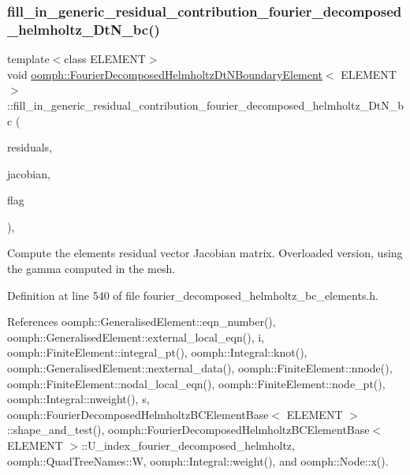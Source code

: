 \subsubsection{\texorpdfstring{fill\+\_\+in\+\_\+generic\+\_\+residual\+\_\+contribution\+\_\+fourier\+\_\+decomposed\+\_\+helmholtz\+\_\+\+Dt\+N\+\_\+bc()}{fill\_in\_generic\_residual\_contribution\_fourier\_decomposed\_helmholtz\_DtN\_bc()}}
{\footnotesize\ttfamily template$<$class E\+L\+E\+M\+E\+NT$>$ \\
void \hyperlink{classoomph_1_1FourierDecomposedHelmholtzDtNBoundaryElement}{oomph\+::\+Fourier\+Decomposed\+Helmholtz\+Dt\+N\+Boundary\+Element}$<$ E\+L\+E\+M\+E\+NT $>$\+::fill\+\_\+in\+\_\+generic\+\_\+residual\+\_\+contribution\+\_\+fourier\+\_\+decomposed\+\_\+helmholtz\+\_\+\+Dt\+N\+\_\+bc (\begin{DoxyParamCaption}\item[{\hyperlink{classoomph_1_1Vector}{Vector}$<$ double $>$ \&}]{residuals,  }\item[{\hyperlink{classoomph_1_1DenseMatrix}{Dense\+Matrix}$<$ double $>$ \&}]{jacobian,  }\item[{const unsigned \&}]{flag }\end{DoxyParamCaption})\hspace{0.3cm}{\ttfamily [inline]}, {\ttfamily [private]}}



Compute the element\textquotesingle{}s residual vector Jacobian matrix. Overloaded version, using the gamma computed in the mesh. 



Definition at line 540 of file fourier\+\_\+decomposed\+\_\+helmholtz\+\_\+bc\+\_\+elements.\+h.



References oomph\+::\+Generalised\+Element\+::eqn\+\_\+number(), oomph\+::\+Generalised\+Element\+::external\+\_\+local\+\_\+eqn(), i, oomph\+::\+Finite\+Element\+::integral\+\_\+pt(), oomph\+::\+Integral\+::knot(), oomph\+::\+Generalised\+Element\+::nexternal\+\_\+data(), oomph\+::\+Finite\+Element\+::nnode(), oomph\+::\+Finite\+Element\+::nodal\+\_\+local\+\_\+eqn(), oomph\+::\+Finite\+Element\+::node\+\_\+pt(), oomph\+::\+Integral\+::nweight(), s, oomph\+::\+Fourier\+Decomposed\+Helmholtz\+B\+C\+Element\+Base$<$ E\+L\+E\+M\+E\+N\+T $>$\+::shape\+\_\+and\+\_\+test(), oomph\+::\+Fourier\+Decomposed\+Helmholtz\+B\+C\+Element\+Base$<$ E\+L\+E\+M\+E\+N\+T $>$\+::\+U\+\_\+index\+\_\+fourier\+\_\+decomposed\+\_\+helmholtz, oomph\+::\+Quad\+Tree\+Names\+::W, oomph\+::\+Integral\+::weight(), and oomph\+::\+Node\+::x().

